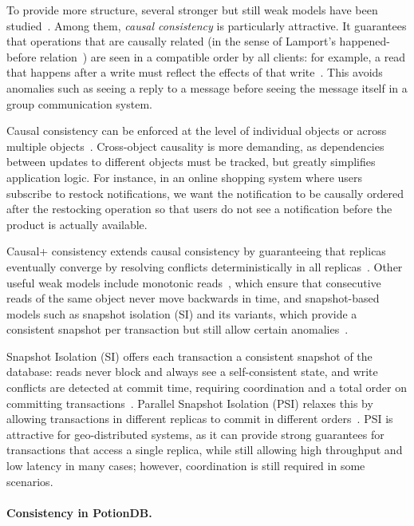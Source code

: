 To provide more structure, several stronger but still weak models have been
studied~\cite{bailis2013eventually,occic2012causal,session,adya1999weak,swiftcloud,lamport2019time}.
Among them, \emph{causal consistency} is particularly attractive. It guarantees
that operations that are causally related (in the sense of Lamport’s happened-before
relation~\cite{lamport2019time}) are seen in a compatible order by all clients:
for example, a read that happens after a write must reflect the effects of that
write~\cite{occic2012causal,bailis2013eventually}. This avoids anomalies such as
seeing a reply to a message before seeing the message itself in a group
communication system.

Causal consistency can be enforced at the level of individual objects or across
multiple objects~\cite{bailis2013eventually}. Cross-object causality is more
demanding, as dependencies between updates to different objects must be tracked,
but greatly simplifies application logic. For instance, in an online shopping
system where users subscribe to restock notifications, we want the notification
to be causally ordered after the restocking operation so that users do not see a
notification before the product is actually available.

Causal+ consistency extends causal consistency by guaranteeing that replicas
eventually converge by resolving conflicts deterministically in all replicas~\cite{occic2012causal,bailis2013eventually}.
Other useful weak models include monotonic reads~\cite{session}, which
ensure that consecutive reads of the same object never move backwards in time,
and snapshot-based models such as snapshot isolation (SI) and its variants,
which provide a consistent snapshot per transaction but still allow certain
anomalies~\cite{si,yu2000practical}.

Snapshot Isolation (SI) offers each transaction a consistent snapshot of the
database: reads never block and always see a self-consistent state, and write
conflicts are detected at commit time, requiring coordination and a total order
on committing transactions~\cite{si}. Parallel Snapshot Isolation
(PSI) relaxes this by allowing transactions in different replicas to commit in
different orders~\cite{walter}. PSI is attractive for geo-distributed systems, as it
can provide strong guarantees for transactions that access a single replica,
while still allowing high throughput and low latency in many cases; however,
coordination is still required in some scenarios.

\paragraph{Consistency in PotionDB.}

